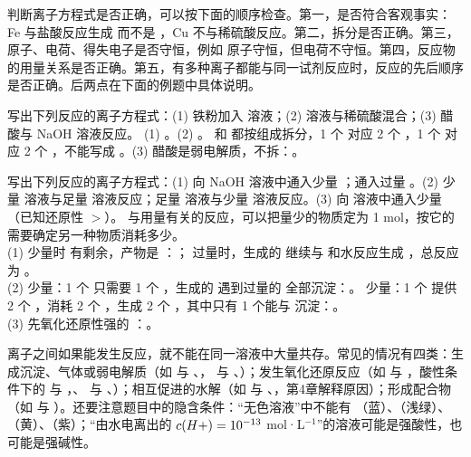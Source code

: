 判断离子方程式是否正确，可以按下面的顺序检查。第一，是否符合客观事实：Fe 与盐酸反应生成  而不是 ，Cu 不与稀硫酸反应。第二，拆分是否正确。第三，原子、电荷、得失电子是否守恒，例如  原子守恒，但电荷不守恒。第四，反应物的用量关系是否正确。第五，有多种离子都能与同一试剂反应时，反应的先后顺序是否正确。后两点在下面的例题中具体说明。

\begin{liti}[基础]
写出下列反应的离子方程式：(1) 铁粉加入  溶液；(2)  溶液与稀硫酸混合；(3) 醋酸与 NaOH 溶液反应。
\tcblower
\jie (1) 。(2) 。 和  都按组成拆分，1 个  对应 2 个 ，1 个  对应 2 个 ，不能写成 。(3) 醋酸是弱电解质，不拆：。
\end{liti}

\begin{liti}[典型]
写出下列反应的离子方程式：(1) 向 NaOH 溶液中通入少量 ；通入过量 。(2) 少量  溶液与足量  溶液反应；足量  溶液与少量  溶液反应。(3) 向  溶液中通入少量 （已知还原性 $>$）。
\tcblower
\silu 与用量有关的反应，可以把量少的物质定为 1 mol，按它的需要确定另一种物质消耗多少。\\
\jie (1)  少量时  有剩余，产物是 ：； 过量时，生成的  继续与  和水反应生成 ，总反应为 。\\
(2)  少量：1 个  只需要 1 个 ，生成的  遇到过量的  全部沉淀：。 少量：1 个  提供 2 个 ，消耗 2 个 ，生成 2 个 ，其中只有 1 个能与  沉淀：。\\
(3)  先氧化还原性强的 ：。
\end{liti}

离子之间如果能发生反应，就不能在同一溶液中大量共存。常见的情况有四类：生成沉淀、气体或弱电解质（如  与 、， 与 、）；发生氧化还原反应（如  与 ，酸性条件下的  与 ，、 与 、）；相互促进的水解（如  与 、，第4章解释原因）；形成配合物（如  与 ）。还要注意题目中的隐含条件：“无色溶液”中不能有 （蓝）、（浅绿）、（黄）、（紫）；“由水电离出的 $c(H+)=10^{-13}$ mol·L$^{-1}$”的溶液可能是强酸性，也可能是强碱性。

